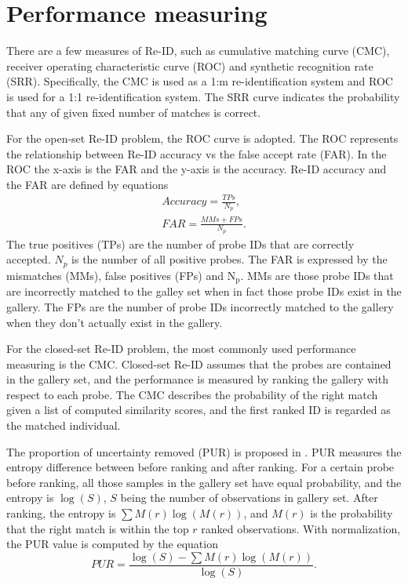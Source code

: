 \section{Performance measuring}
There are a few measures of Re-ID, such as cumulative matching curve (CMC), receiver operating characteristic curve (ROC) and synthetic recognition rate (SRR). Specifically, the CMC is used as a 1:m re-identification system and ROC is used for a 1:1 re-identification system. The
SRR curve indicates the probability that any of given fixed number of matches is correct.

For the open-set Re-ID problem, the ROC \cite{PartbasedSTReid, MultiPersonREID} curve is adopted. The ROC represents the relationship between Re-ID accuracy vs the false accept rate (FAR). In the ROC the x-axis is the FAR and the y-axis is the accuracy. Re-ID accuracy and the FAR are defined by equations
\begin{equation}
\begin{aligned}
Accuracy = \frac{TPs}{N_p},\\
FAR = \frac{MMs + FPs}{N_p}.
\end{aligned}
\end{equation}
The true positives (TPs) are the number of probe IDs that are correctly accepted. $N_p$ is the number of all positive probes. The FAR is expressed by the mismatches (MMs), false positives (FPs) and N$_\text{p}$. MMs are those probe IDs that are incorrectly matched to the galley set when in fact those probe IDs exist in the gallery. The FPs are the number of probe IDs incorrectly matched to the gallery when they don't actually exist in the gallery. 

For the closed-set Re-ID problem, the most commonly used performance measuring is the CMC. Closed-set Re-ID assumes that the probes are contained in the gallery set, and the performance is measured by ranking the gallery with respect to each probe. The CMC describes the probability of the right match given a list of computed similarity scores, and the first ranked ID is regarded as the matched individual.

The proportion of uncertainty removed (PUR) is proposed in \cite{LFDA}. PUR measures the entropy difference between before ranking and after ranking. For a certain probe before ranking, all those samples in the gallery set have equal probability, and the entropy is $\log(S)$, $S$ being the number of observations in gallery set. After ranking, the entropy is $\sum M(r)\log(M(r))$, and $M(r)$ is the probability that the right match is within the top $r$ ranked observations. With normalization, the PUR value is computed by the equation
\begin{equation}
PUR = \frac{\log(S)-\sum M(r)\log(M(r))}{\log(S)}.
\end{equation}

